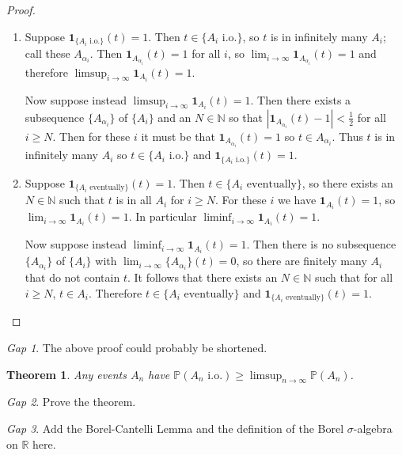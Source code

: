 \documentclass[11pt]{article}
\newcommand{\p}{\mathbb{P}}
\newcommand{\ind}[1]{\mathbf{1}_{#1}}
\newcommand{\NN}{\mathbb{N}}
\newcommand{\RR}{\mathbb{R}}
\theoremstyle{theorem}
\newtheorem{theorem}{Theorem}[section]
\theoremstyle{definition}
\theoremstyle{remark}
\theoremstyle{step}
\theoremstyle{gap}
\newtheorem*{gap}{Gap}
\begin{document}
\begin{proof}\ 
\begin{enumerate}
\item
Suppose \(\ind{\{A_i \text{ i.o.}\}}(t) = 1\). Then \(t \in \{A_i \text{ i.o.}\}\), so \(t\) is in infinitely many \(A_i\); call these \(A_{\alpha_i}\). Then \(\ind{A_{\alpha_i}}(t) = 1\) for all \(i\), so \(\lim_{i \to \infty} \ind{A_{\alpha_i}}(t) = 1\) and therefore \(\limsup_{i \to \infty} \ind{A_{i}}(t) = 1\).

Now suppose instead \(\limsup_{i \to \infty} \ind{A_{i}}(t) = 1\). Then there exists a subsequence \(\{A_{\alpha_i}\}\) of \(\{A_i\}\) and an \(N \in \NN\) so that \(\left|\ind{A_{\alpha_i}}(t) - 1 \right| < \frac{1}{2}\) for all \(i \geq N\). Then for these \(i\) it must be that  \(\ind{A_{\alpha_i}}(t) = 1\) so \(t \in A_{\alpha_i}\). Thus \(t\) is in infinitely many \(A_i\) so \(t \in \{A_i \text{ i.o.}\}\) and \(\ind{\{A_i \text{ i.o.}\}}(t) = 1\).

\item
Suppose \(\ind{\{A_i \text{ eventually}\}}(t) = 1\). Then \(t \in \{A_i \text{ eventually}\}\), so there exists an \(N \in \NN\) such that \(t\) is in all \(A_i\) for \(i \geq N\). For these \(i\) we have \(\ind{A_i}(t)=1\), so \(\lim_{i \to \infty} \ind{A_i}(t) = 1\). In particular \(\liminf_{i \to \infty} \ind{A_i}(t) = 1\).

Now suppose instead \(\liminf_{i \to \infty} \ind{A_i}(t) = 1\). Then there is no subsequence \(\{A_{\alpha_i}\}\) of \(\{A_i\}\) with \(\lim_{i \to \infty}\{A_{\alpha_i}\}(t) =0\), so there are finitely many \(A_i\) that do not contain \(t\). It follows that there exists an \(N \in \NN\) such that for all \(i \geq N\), \(t \in A_i\). Therefore \(t \in \{A_i \text{ eventually}\}\) and \(\ind{\{A_i \text{ eventually}\}}(t) = 1\).
\end{enumerate}
\end{proof}

\begin{gap}
The above proof could probably be shortened.
\end{gap}

\begin{theorem}
Any events \(A_n\) have \(\p(A_n \text{ i.o.}) \geq \limsup_{n\to\infty} \p(A_n)\).
\end{theorem}

\begin{gap}
Prove the theorem.
\end{gap}

\begin{gap} Add the Borel-Cantelli Lemma and the definition of the Borel \(\sigma\)-algebra on \(\RR\) here.\end{gap}
\end{document}

